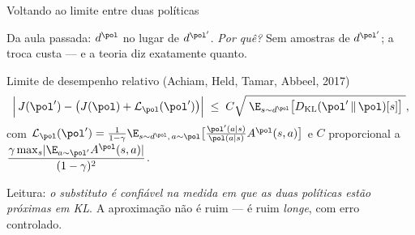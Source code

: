 \documentclass[aspectratio=169, 10pt]{beamer}
\newcommand{\polnovo}{\pol'}
\newcommand{\Advpi}{A^{\pol}}
\newcommand{\Dkl}{D_{\mathrm{KL}}}
\newcommand{\dpi}{d^{\pol}}
\newcommand{\Lsub}[1]{\mathcal{L}_{#1}}
\begin{document}
\begin{frame}{Voltando ao limite entre duas políticas}

  Da aula passada: $\dpi$ no lugar de $d^{\polnovo}$. \emph{Por quê?} Sem amostras
  de $d^{\polnovo}$; a troca custa --- e a teoria diz exatamente quanto.

  \begin{teobox}{Limite de desempenho relativo (Achiam, Held, Tamar, Abbeel, 2017)}
    \[
      \Bigl\lvert\, J(\polnovo) - \bigl(J(\pol) + \Lsub{\pol}(\polnovo)\bigr) \Bigr\rvert
      \;\le\; C \sqrt{\;\E_{s\sim \dpi}\bigl[\Dkl(\polnovo \,\|\, \pol)[s]\bigr]\;},
    \]
    com $\Lsub{\pol}(\polnovo) = \frac{1}{1-\gamma}
      \E_{s\sim\dpi,\,a\sim\pol}\bigl[\frac{\polnovo(a\mid s)}{\pol(a\mid s)}\Advpi(s,a)\bigr]$
    e $C$ proporcional a $\dfrac{\gamma \max_s\lvert\E_{a\sim\polnovo}\Advpi(s,a)\rvert}{(1-\gamma)^2}$.
  \end{teobox}

  \begin{ideiabox}
    Leitura: \emph{o substituto é confiável na medida em que as duas políticas estão
    próximas em KL}. A aproximação não é ruim --- é ruim \emph{longe}, com erro
    controlado.
  \end{ideiabox}
\end{frame}
\end{document}
